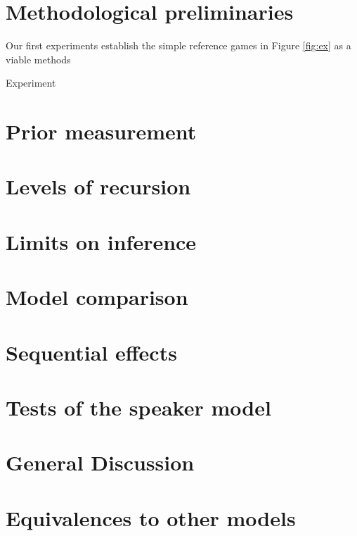 \documentclass[man,noapacite]{apa2}
\begin{document}
\section{Methodological preliminaries}



Our first experiments establish the simple reference games in Figure \ref{fig:ex} as a viable methods

Experiment


\section{Prior measurement}



\section{Levels of recursion}

\section{Limits on inference}


\section{Model comparison}




\section{Sequential effects}

\section{Tests of the speaker model}




\section{General Discussion}


\newpage




\theappendix

\section{Equivalences to other models}

\end{document}

